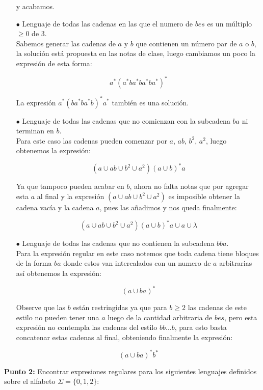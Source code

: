 \begin{itemize}
    y acabamos.

    \item[$\bullet$]Lenguaje de todas las cadenas en las que el numero de $bes$ es un múltiplo $\geq0$ de 3.\\ 

    Sabemos generar las cadenas de $a$ y $b$ que contienen un número par de $a$ o $b$, la solución está propuesta en las notas de clase, luego cambiamos un poco la expresión de esta forma:

    $$a^*(a^*ba^*ba^*ba^*)^*$$

    La expresión $a^*(ba^*ba^*b)^*a^*$ también es una solución.

    \item[$\bullet$] Lenguaje de todas las cadenas que no comienzan con la subcadena $ba$ ni terminan en $b.$\\ 

    Para este caso las cadenas pueden comenzar por $a$, $ab$, $b^2$, $a^2$, luego obtenemos la expresión:

    $$(a\cup ab \cup b^2 \cup a^2)(a \cup b)^*a $$

    Ya que tampoco pueden acabar en $b$, ahora no falta notas que por agregar esta $a$ al final y la expresión $(a\cup ab \cup b^2 \cup a^2)$ es imposible obtener la cadena vacía y la cadena $a$, pues las añadimos y nos queda finalmente:

     $$(a\cup ab \cup b^2 \cup a^2)(a \cup b)^*a \cup a \cup \lambda$$

     \item[$\bullet$] Lenguaje de todas las cadenas que no contienen la subcadena $bba.$\\ 

     Para la expresión regular en este caso notemos que toda cadena tiene bloques de la forma $ba$ donde estos van intercalados con un numero de $a$ arbitrarias así obtenemos la expresión:

     $$(a\cup ba)^*$$

     Observe que las $b$ están restringidas ya que para $b\geq 2$ las cadenas de este estilo no pueden tener una $a$ luego de la cantidad arbitraria de $bes$, pero esta expresión no contempla las cadenas del estilo $bb\dots b$, para esto basta concatenar estas cadenas al final, obteniendo finalmente la expresión:

     $$(a\cup ba)^*b^*$$

\end{itemize}

\textbf{Punto 2: } Encontrar expresiones regulares para los siguientes lenguajes definidos sobre el alfabeto $\Sigma=\{0,1,2\}:$

